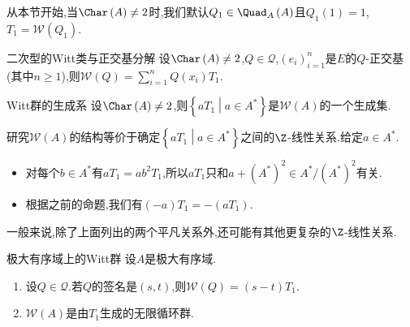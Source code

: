 从本节开始,当$\Char\left(A\right)\neq 2$时,我们默认$Q_{1}\in\Quad_{A}\left(A\right)$且$Q_{1}\left(1\right)=1$,$T_{1}=\mathcal{W}\left(Q_{1}\right)$.

\begin{proposition}{二次型的Witt类与正交基分解}{}
	设$\Char\left(A\right)\neq 2$,$Q\in\mathcal{Q}$,$\left(e_{i}\right)_{i=1}^{n}$是$E$的$Q$-正交基(其中$n\geq 1$),则$\mathcal{W}\left(Q\right)=\sum\limits_{i=1}^{n}Q\left(x_{i}\right)T_{1}$.
\end{proposition}

\begin{corollary}{Witt群的生成系}{}
	设$\Char\left(A\right)\neq 2$,则$\left\{aT_{1}\middle|a\in A^{\ast}\right\}$是$\mathcal{W}\left(A\right)$的一个生成集.
\end{corollary}

\begin{remark}{}{}
	研究$\mathcal{W}\left(A\right)$的结构等价于确定$\left\{aT_{1}\middle|a\in A^{\ast}\right\}$之间的$\Z$-线性关系.给定$a\in A^{\ast}$.
	\begin{itemize}
		\item 对每个$b\in A^{\ast}$有$aT_{1}=ab^{2}T_{1}$,所以$aT_{1}$只和$a+\left(A^{\ast}\right)^{2}\in A^{\ast}/\left(A^{\ast}\right)^{2}$有关.
		\item 根据之前的命题,我们有$\left(-a\right)T_{1}=-\left(aT_{1}\right)$.
	\end{itemize}
	一般来说,除了上面列出的两个平凡关系外,还可能有其他更复杂的$\Z$-线性关系.
\end{remark}

\begin{proposition}{极大有序域上的Witt群}{}
	设$A$是极大有序域.
	\begin{enumerate}
		\item 设$Q\in\mathcal{Q}$.若$Q$的签名是$\left(s,t\right)$,则$\mathcal{W}\left(Q\right)=\left(s-t\right)T_{1}$.
		\item $\mathcal{W}\left(A\right)$是由$T_{1}$生成的无限循环群.
	\end{enumerate}
\end{proposition}












